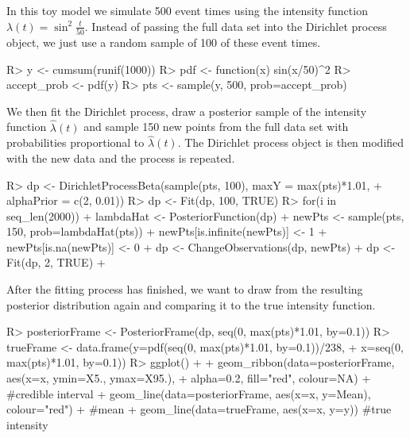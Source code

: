 \documentclass[nojss]{jss}
\begin{document}
In this toy model we simulate 500 event times using the intensity function $\lambda (t) = \sin ^2 \frac{t}{50}$. Instead of passing the full data set into the Dirichlet process object, we just use a random sample of 100 of these event times.

\begin{Schunk}
\begin{Sinput}
R> y <- cumsum(runif(1000))
R> pdf <- function(x) sin(x/50)^2
R> accept_prob <- pdf(y)
R> pts <- sample(y, 500, prob=accept_prob)
\end{Sinput}
\end{Schunk}

We then fit the Dirichlet process, draw a posterior sample of the intensity function $\hat{\lambda} (t)$ and sample 150 new points from the full data set with probabilities proportional to $\hat{\lambda} (t)$. The Dirichlet process object is then modified with the new data and the process is repeated.

\begin{Schunk}
\begin{Sinput}
R> dp <- DirichletProcessBeta(sample(pts, 100), maxY = max(pts)*1.01,
+  alphaPrior = c(2, 0.01))
R> dp <- Fit(dp, 100, TRUE)
R> for(i in seq_len(2000)){
+    lambdaHat <- PosteriorFunction(dp)
+    newPts <- sample(pts, 150, prob=lambdaHat(pts))
+    newPts[is.infinite(newPts)] <- 1
+    newPts[is.na(newPts)] <- 0
+    dp <- ChangeObservations(dp, newPts)
+    dp <- Fit(dp, 2, TRUE)
+  }
\end{Sinput}
\end{Schunk}

After the fitting process has finished, we want to draw from the resulting posterior distribution again and comparing it to the true intensity function.

\begin{Schunk}
\begin{Sinput}
R> posteriorFrame <- PosteriorFrame(dp, seq(0, max(pts)*1.01, by=0.1))
R> trueFrame <- data.frame(y=pdf(seq(0, max(pts)*1.01, by=0.1))/238,
+                          x=seq(0, max(pts)*1.01, by=0.1))
R> ggplot() +
+    geom_ribbon(data=posteriorFrame, aes(x=x, ymin=X5., ymax=X95.),
+                alpha=0.2, fill="red", colour=NA) + #credible interval
+    geom_line(data=posteriorFrame, aes(x=x, y=Mean), colour="red") + #mean
+    geom_line(data=trueFrame, aes(x=x, y=y)) #true intensity
\end{Sinput}
\end{Schunk}
\end{document}
